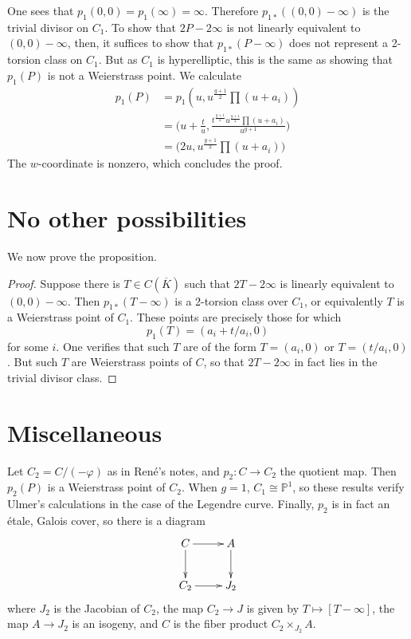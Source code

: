 \documentclass{article}
\theoremstyle{plain}
\theoremstyle{definition}
\theoremstyle{remark}
\newcommand{\isom}{\cong}
\renewcommand{\phi}{\varphi}
\newcommand{\Kb}{\overline{K}}
\newcommand{\Pro}{\ensuremath{\mathbb{P}}}
\begin{document}
One sees that $p_1(0,0) = p_1(\infty) = \infty$. Therefore $p_{1*}((0,0) - \infty)$ is the trivial divisor on $C_1$. To show that $2P - 2\infty$ is not linearly equivalent to $(0,0) - \infty$, then, it suffices to show that $p_{1*}(P - \infty)$ does not represent a 2-torsion class on $C_1$. But as $C_1$ is hyperelliptic, this is the same as showing that $p_1(P)$ is not a Weierstrass point. We calculate
\begin{align*}
  p_1(P) &= p_1(u, u^{\frac{g+1}{2}} \prod (u + a_i)) \\
  &= \bigg(u + \frac{t}{u}, \frac{t^{\frac{g+1}{2}}u^{\frac{g+1}{2}} \prod (u + a_i)}{u^{g+1}}\bigg) \\
  &= \bigg(2u, u^{\frac{g+1}{2}} \prod (u + a_i)\bigg)
\end{align*}
The $w$-coordinate is nonzero, which concludes the proof.


\section{No other possibilities}
\label{sec:no-other-poss}

We now prove the proposition.

\begin{proof}
Suppose there is $T \in C(\Kb)$ such that $2T - 2\infty$ is linearly equivalent to $(0,0) - \infty$. Then $p_{1*}(T-\infty)$ is a 2-torsion class over $C_1$, or equivalently $T$ is a Weierstrass point of $C_1$. These points are precisely those for which 
\[
p_1(T) = (a_i + t/a_i,0)
\]
for some $i$. One verifies that such $T$ are of the form $T = (a_i, 0)$ or $T = (t/a_i, 0)$. But such $T$ are Weierstrass points of $C$, so that $2T - 2\infty$ in fact lies in the trivial divisor class.
\end{proof}


\section{Miscellaneous}
\label{sec:miscellaneous}

  Let $C_2 = C/(-\phi)$ as in Ren\'e's notes, and $p_2: C \to C_2$ the quotient map. Then $p_2(P)$ is a Weierstrass point of $C_2$. When $g = 1$, $C_1 \isom \Pro^1$, so these results verify Ulmer's calculations in the case of the Legendre curve. Finally, $p_2$ is in fact an \'etale, Galois cover, so there is a diagram
\[
\xymatrix{
  C \ar[r] \ar[d] & A \ar[d] \\
  C_2 \ar[r] & J_2
  }
\]
where $J_2$ is the Jacobian of $C_2$, the map $C_2 \to J$ is given by $T \mapsto [T - \infty]$, the map $A \to J_2$ is an isogeny, and $C$ is the fiber product $C_2 \times_{J_2} A$.




\end{document}
